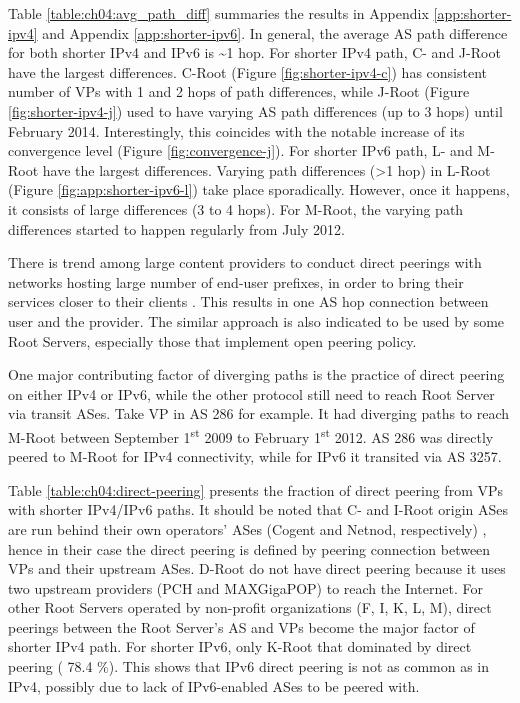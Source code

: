 Table \ref{table:ch04:avg_path_diff} summaries the results in Appendix \ref{app:shorter-ipv4} and Appendix \ref{app:shorter-ipv6}. In general, the average AS path difference for both shorter IPv4 and IPv6 is \textasciitilde1 hop. For shorter IPv4 path, C- and J-Root have the largest differences. C-Root (Figure \ref{fig:shorter-ipv4-c}) has consistent number of VPs with 1 and 2 hops of path differences, while J-Root (Figure \ref{fig:shorter-ipv4-j}) used to have varying AS path differences (up to 3 hops) until February 2014. Interestingly, this coincides with the notable increase of its convergence level (Figure \ref{fig:convergence-j}). For shorter IPv6 path, L- and M-Root have the largest differences. Varying path differences (\textgreater1 hop) in L-Root (Figure \ref{fig:app:shorter-ipv6-l}) take place sporadically. However, once it happens, it consists of large differences (3 to 4 hops). For M-Root, the varying path differences started to happen regularly from July 2012.


There is trend among large content providers to conduct direct peerings with networks hosting large number of end-user prefixes, in order to bring their services closer to their clients \cite{Chiu:2015:WOH:2815675.2815719}. This results in one AS hop connection between user and the provider. The similar approach is also indicated to be used by some Root Servers, especially those that implement open peering policy.

One major contributing factor of diverging paths is the practice of direct peering on either IPv4 or IPv6, while the other protocol still need to reach Root Server via transit ASes. Take VP in AS 286 for example. It had diverging paths to reach M-Root between September 1\textsuperscript{st} 2009 to February 1\textsuperscript{st} 2012. AS 286 was directly peered to M-Root for IPv4 connectivity, while for IPv6 it transited via AS 3257. 

Table \ref{table:ch04:direct-peering} presents the fraction of direct peering from VPs with shorter IPv4/IPv6 paths. It should be noted that C- and I-Root origin ASes are run behind their own operators' ASes (Cogent and Netnod, respectively) , hence in their case the direct peering is defined by peering connection between VPs and their upstream ASes. D-Root do not have direct peering because it uses two upstream providers (PCH and MAXGigaPOP) to reach the Internet. For other Root Servers operated by non-profit organizations (F, I, K, L, M), direct peerings between the Root Server's AS and VPs become the major factor of shorter IPv4 path. For shorter IPv6, only K-Root that dominated by direct peering ( 78.4 \%). This shows that IPv6 direct peering is not as common as in IPv4, possibly due to lack of IPv6-enabled ASes to be peered with.

